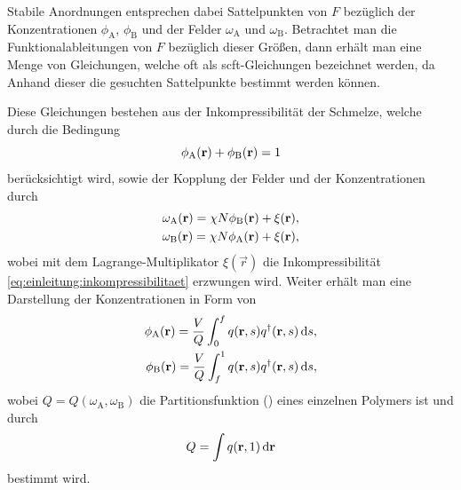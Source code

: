 Stabile Anordnungen entsprechen dabei Sattelpunkten von $F$ bezüglich der Konzentrationen $\phi_{\mathrm{A}}$, $\phi_{\mathrm{B}}$ und der Felder $\omega_{\mathrm{A}}$ und $\omega_{\mathrm{B}}$.
Betrachtet man die Funktionalableitungen von $F$ bezüglich dieser Größen, dann erhält man eine Menge von Gleichungen, welche oft als \ac{scft}-Gleichungen bezeichnet werden, da Anhand dieser die gesuchten Sattelpunkte bestimmt werden können.

Diese Gleichungen bestehen aus der Inkompressibilität der Schmelze, welche durch die Bedingung
\begin{equation}
\label{eq:einleitung:inkompressibilitaet}
\noeqref{eq:einleitung:inkompressibilitaet}
    \phi_{\mathrm{A}}(\vec{r}) + \phi_{\mathrm{B}}(\vec{r}) = 1
\end{equation}%
berücksichtigt wird, sowie der Kopplung der Felder und der Konzentrationen durch
\begin{equation}
\label{eq:einleitung:felder}
\noeqref{eq:einleitung:felder}
    \begin{aligned}
        \omega_{\mathrm{A}}(\vec{r}) = \chi N \phi_{\mathrm{B}}(\vec{r}) + \xi(\vec{r}),\\
        \omega_{\mathrm{B}}(\vec{r}) = \chi N \phi_{\mathrm{A}}(\vec{r}) + \xi(\vec{r}),
    \end{aligned}
\end{equation}%
wobei mit dem Lagrange-Multiplikator $\xi(\vec{r})$ die Inkompressibilität \eqref{eq:einleitung:inkompressibilitaet} erzwungen wird.
Weiter erhält man eine Darstellung der Konzentrationen in Form von
\begin{equation}
\label{eq:einleitung:konzentrationen}
\noeqref{eq:einleitung:konzentrationen}
    \begin{aligned}
        \phi_{\mathrm{A}}(\vec{r}) = \frac{V}{Q} \int_{0}^{f} q(\vec{r}, s) q^{\dagger}(\vec{r}, s) \diff s,\\
        \phi_{\mathrm{B}}(\vec{r}) = \frac{V}{Q} \int_{f}^{1} q(\vec{r}, s) q^{\dagger}(\vec{r}, s) \diff s,
    \end{aligned}
\end{equation}%
wobei $Q = Q(\omega_{\mathrm{A}}, \omega_{\mathrm{B}})$ die Partitionsfunktion () eines einzelnen Polymers ist und durch
\begin{equation}
\label{eq:einleitung:part_funk_q}
\noeqref{eq:einleitung:part_funk_q}
    Q = \int q(\vec{r}, 1) \diff \vec{r}
\end{equation}%
bestimmt wird.

